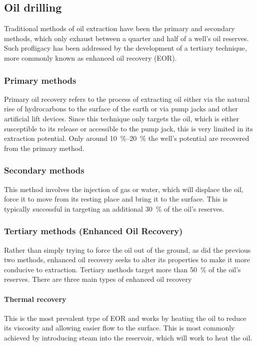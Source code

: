 \subsection{Oil drilling}
Traditional methods of oil extraction have been the primary and secondary methods, which only exhaust between a quarter and half of a well’s oil reserves.
Such profligacy has been addressed by the development of a tertiary technique, more commonly known as enhanced oil recovery (EOR).

\subsubsection{Primary methods}
Primary oil recovery refers to the process of extracting oil either via the natural rise of hydrocarbons to the surface of the earth or via pump jacks and other artificial lift devices.
Since this technique only targets the oil, which is either susceptible to its release or accessible to the pump jack, this is very limited in its extraction potential.
Only around \SIrange{10}{20}{\percent} the well’s potential are recovered from the primary method.

\subsubsection{Secondary methods}
This method involves the injection of gas or water, which will displace the oil, force it to move from its resting place and bring it to the surface.
This is typically successful in targeting an additional \SI{30}{\percent} of the oil’s reserves.

\subsubsection{Tertiary methods (Enhanced Oil Recovery)}
Rather than simply trying to force the oil out of the ground, as did the previous two methods, enhanced oil recovery seeks to alter its properties to make it more conducive to extraction.
Tertiary methods target more than \SI{50}{\percent} of the oil’s reserves.
There are three main types of enhanced oil recovery

\paragraph{Thermal recovery}
This is the most prevalent type of EOR and works by heating the oil to reduce its viscosity and allowing easier flow to the surface.
This is most commonly achieved by introducing steam into the reservoir, which will work to heat the oil.

